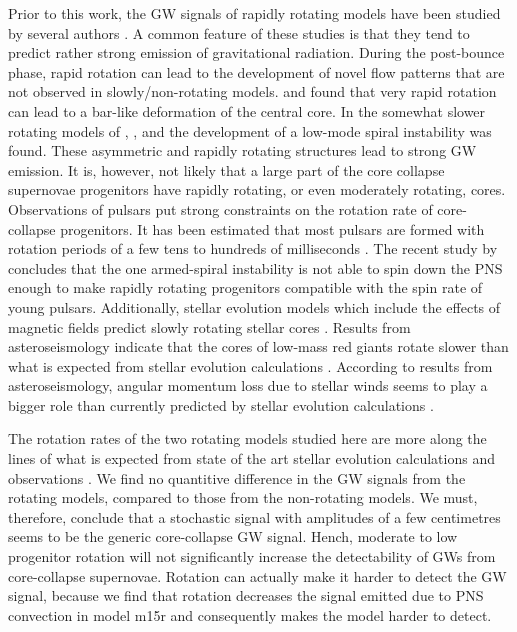 Prior to this work, the GW signals of rapidly rotating models have been studied 
by several authors \citep{mueller_82,rampp_98,shibata_05,ott_05,scheidegger_10,kuroda_14,takiwaki_16}. 
A common feature of these studies is that they tend to predict rather strong emission of gravitational radiation. 
During the post-bounce phase, rapid rotation can lead to the
development of novel flow patterns that are not observed in slowly/non-rotating models.
\cite{rampp_98} and \cite{shibata_05} found that very rapid rotation can
lead to a bar-like deformation of the central core. In the somewhat slower 
rotating models of \cite{ott_05}, \cite{kuroda_14}, and \cite{takiwaki_16} the development of
a low-mode spiral instability was found. These asymmetric and rapidly rotating structures
lead to strong GW emission. 
It is, however, not likely that a large part of the core collapse supernovae progenitors
have rapidly rotating, or even moderately rotating, cores. Observations of pulsars put
strong constraints on the rotation rate of core-collapse progenitors. It has been estimated that
most pulsars are formed with rotation periods of a few tens to hundreds of milliseconds \citep{vranesevic_04,popov_12,noutsos_13}.
The recent study by \cite{kazeroni_17} concludes that
the one armed-spiral instability \citep{ott_05,kuroda_14,takiwaki_16} is not able to spin down the PNS enough to make rapidly rotating progenitors compatible with the spin rate of young
pulsars. Additionally, stellar evolution models which include the effects of magnetic fields predict
slowly rotating stellar cores \citep{heger_05}. Results from asteroseismology \citep{beck_12,mosser_12} indicate
that the cores of low-mass red giants rotate slower than what is expected from stellar evolution calculations \citep{cantiello_14,deheuvels_14}.
According to results from asteroseismology, angular momentum loss due to stellar winds seems to play a bigger role than currently predicted by stellar evolution calculations \citep{cantiello_14}. 

The rotation rates of the two rotating models studied here are more along the lines of what 
is expected from state of the art stellar evolution calculations \citep{heger_05} and observations 
\citep{beck_12,mosser_12,popov_12,noutsos_13,cantiello_14,deheuvels_14}. 
We find no quantitive difference in the GW signals from the rotating models, compared to those from the non-rotating models. 
We must, therefore, conclude that a stochastic signal with amplitudes of a few centimetres seems to be the generic core-collapse GW signal.
Hench, moderate to low progenitor rotation will not significantly increase the detectability of GWs from core-collapse supernovae. Rotation can actually
make it harder to detect the GW signal, because we find that rotation decreases the signal emitted due to PNS convection in model m15r and
consequently makes the model harder to detect.  

